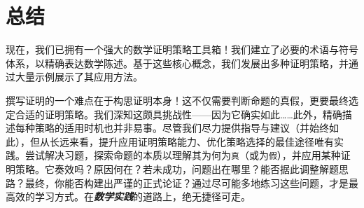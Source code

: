 \section{总结}

现在，我们已拥有一个强大的数学证明策略工具箱！我们建立了必要的术语与符号体系，以精确表达数学陈述。基于这些核心概念，我们发展出多种证明策略，并通过大量示例展示了其应用方法。

撰写证明的一个难点在于构思证明本身！这不仅需要判断命题的真假，更要最终选定合适的证明策略。我们深知这颇具挑战性——因为它确实如此……此外，精确描述每种策略的适用时机也并非易事。尽管我们尽力提供指导与建议（并始终如此），但从长远来看，提升应用证明策略能力、优化策略选择的最佳途径唯有实践。尝试解决习题，探索命题的本质以理解其为何为\verb|真|（或为\verb|假|），并应用某种证明策略。它奏效吗？原因何在？若未成功，问题出在哪里？能否据此调整解题思路？最终，你能否构建出严谨的正式论证？通过尽可能多地练习这些问题，才是最高效的学习方式。在\emph{\textbf{数学实践}}的道路上，绝无捷径可走。